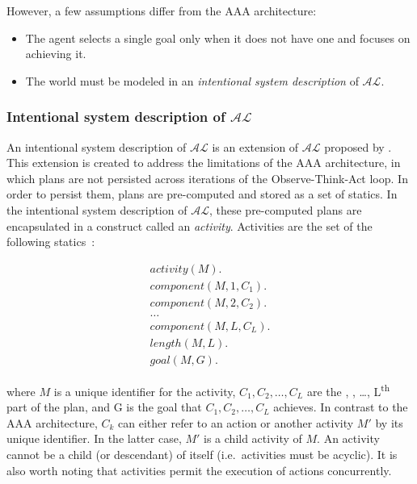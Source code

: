 However, a few assumptions differ from the AAA architecture:

\begin{itemize}
    \item The agent selects a single goal only when it does not have one and focuses on achieving it.
    \item The world must be modeled in an \textit{intentional system description} of $\mathcal{AL}$.
\end{itemize}

\subsubsection{Intentional system description of $\mathcal{AL}$}
\label{subsubsec:intentional_action_language_al}

An intentional system description of $ \mathcal{AL} $ is an extension of $ \mathcal{AL} $ proposed by \citet{blount_architecture_2013}.
This extension is created to address the limitations of the AAA architecture, in which plans are not persisted across iterations of the Observe-Think-Act loop.
In order to persist them, plans are pre-computed and stored as a set of statics.
In the intentional system description of $\mathcal{AL}$, these pre-computed plans are encapsulated in a construct called an \textit{activity}.
Activities are the set of the following statics~\citep{blount_architecture_2013, blount_towards_2014}:

\begin{gather}
    activity(M). \\
    component(M, 1, C_1). \\
    component(M, 2, C_2). \\
    \dots \\
    component(M, L, C_L). \\
    length(M, L). \\
    goal(M, G).
\end{gather}

\noindent
where $M$ is a unique identifier for the activity, $C_1, C_2, \dots, C_L$ are the , , \dots, L\textsuperscript{th} part of the plan, and G is the goal that $C_1,C_2,\dots,C_L$ achieves.
In contrast to the AAA architecture, $C_k$ can either refer to an action or another activity $M'$ by its unique identifier.
In the latter case, $M'$ is a child activity of $M$.
An activity cannot be a child (or descendant) of itself (i.e.~activities must be acyclic).
It is also worth noting that activities permit the execution of actions concurrently.


